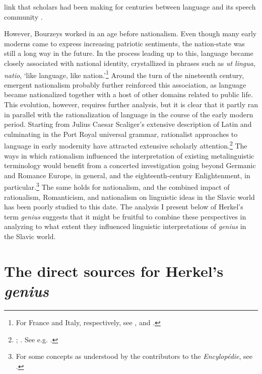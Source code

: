 link that scholars had been making for centuries between language and its speech community \citep[242]{hullen_characterization_2001}.

However, Bourzeys worked in an age before nationalism. Even though many early moderns came to express increasing patriotic sentiments, the nation-state was still a long way in the future. In the process leading up to this, language became closely associated with national identity, crystallized in phrases such as \textit{ut lingua, natio}, ‘like language, like nation.’\footnote{For France and Italy, respectively, see \citet{siouffi_genie_2010}, and \citet{gambarota_irresistible_2011}.} Around the turn of the nineteenth century, emergent nationalism probably further reinforced this association, as language became nationalized together with a host of other domains related to public life. This evolution, however, requires further analysis, but it is clear that it partly ran in parallel with the rationalization of language in the course of the early modern period. Starting from Julius Caesar Scaliger’s extensive description of Latin and culminating in the Port Royal universal grammar, rationalist approaches to language in early modernity have attracted extensive scholarly attention.\footnote{\citet{lardet_jules-cesar_2019}; \citet{arnauld_grammaire_1660}. See e.g. \citet[Chapter 15]{eco_search_1995}.} The ways in which rationalism influenced the interpretation of existing metalinguistic terminology would benefit from a concerted investigation going beyond Germanic and Romance Europe, in general, and the eighteenth-century Enlightenment, in particular.\footnote{For some concepts as understood by the contributors to the \textit{Encylopédie}, see \citet{swiggers_grammaire_1986}.} The same holds for nationalism, and the combined impact of rationalism, Romanticism, and nationalism on linguistic ideas in the Slavic world has been poorly studied to this date. The analysis I present below of Herkel’s term \textit{genius} suggests that it might be fruitful to combine these perspectives in analyzing to what extent they influenced linguistic interpretations of \textit{genius} in the Slavic world.

\section{The direct sources for Herkel’s \textit{genius}}

